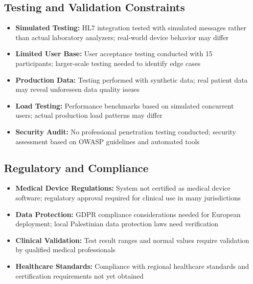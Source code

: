 \documentclass[12pt, a4paper]{report}
\begin{document}
\subsection{Testing and Validation Constraints}
\begin{itemize}
    \item \textbf{Simulated Testing:} HL7 integration tested with simulated messages rather than actual laboratory analyzers; real-world device behavior may differ
    \item \textbf{Limited User Base:} User acceptance testing conducted with 15 participants; larger-scale testing needed to identify edge cases
    \item \textbf{Production Data:} Testing performed with synthetic data; real patient data may reveal unforeseen data quality issues
    \item \textbf{Load Testing:} Performance benchmarks based on simulated concurrent users; actual production load patterns may differ
    \item \textbf{Security Audit:} No professional penetration testing conducted; security assessment based on OWASP guidelines and automated tools
\end{itemize}
\subsection{Regulatory and Compliance}
\begin{itemize}
    \item \textbf{Medical Device Regulations:} System not certified as medical device software; regulatory approval required for clinical use in many jurisdictions
    \item \textbf{Data Protection:} GDPR compliance considerations needed for European deployment; local Palestinian data protection laws need verification
    \item \textbf{Clinical Validation:} Test result ranges and normal values require validation by qualified medical professionals
    \item \textbf{Healthcare Standards:} Compliance with regional healthcare standards and certification requirements not yet obtained
\end{itemize}
\end{document}
